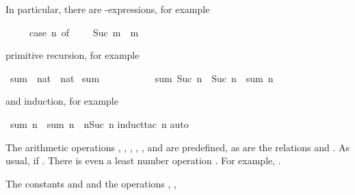 %
\begin{isabellebody}%
\def\isabellecontext{natsum}%
\isamarkupfalse%
%
\begin{isamarkuptext}%
\noindent
In particular, there are -expressions, for example
\begin{isabelle}%
\ \ \ \ \ case\ n\ of\ {}\ {\isasymRightarrow}\ {}\ {\isacharbar}\ Suc\ m\ {\isasymRightarrow}\ m%
\end{isabelle}
primitive recursion, for example%
\end{isamarkuptext}%
\isamarkuptrue%
\ sum\ {\isacharcolon}{\isacharcolon}\ {\isachardoublequote}nat\ {\isasymRightarrow}\ nat{\isachardoublequote}\isanewline
\isamarkupfalse%
\ {\isachardoublequote}sum\ {}\ {\isacharequal}\ {}{\isachardoublequote}\isanewline
\ \ \ \ \ \ \ \ {\isachardoublequote}sum\ {\isacharparenleft}Suc\ n{\isacharparenright}\ {\isacharequal}\ Suc\ n\ {\isacharplus}\ sum\ n{\isachardoublequote}\isamarkupfalse%
%
\begin{isamarkuptext}%
\noindent
and induction, for example%
\end{isamarkuptext}%
\isamarkuptrue%
\ {\isachardoublequote}sum\ n\ {\isacharplus}\ sum\ n\ {\isacharequal}\ n{\isacharasterisk}{\isacharparenleft}Suc\ n{\isacharparenright}{\isachardoublequote}\isanewline
\isamarkupfalse%
induct{\isacharunderscore}tac\ n{\isacharparenright}\isanewline
\isamarkupfalse%
auto{\isacharparenright}\isanewline
\isamarkupfalse%
\isamarkupfalse%
%
\begin{isamarkuptext}%
\newcommand{\mystar}{*%
}
%
The arithmetic operations ,
, \ttindexboldpos{\mystar}{$HOL2arithfun},
, ,  and
 are predefined, as are the relations
 and
. As usual,  if
. There is even a least number operation
\@.  For example, .
\begin{warn}
  The constants  and  and the operations
  , ,

\end{warn}
\end{isamarkuptext}
\end{isabellebody}
